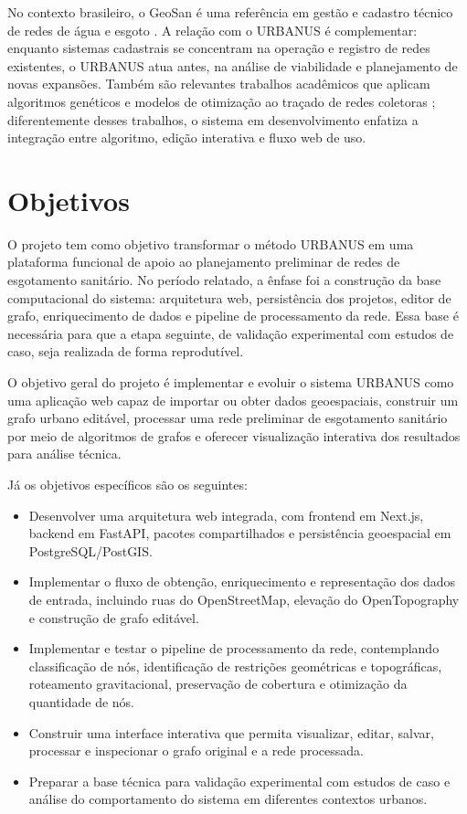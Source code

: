 \documentclass[12pt,a4paper]{article}
\begin{document}
No contexto brasileiro, o GeoSan é uma referência em gestão e cadastro técnico de redes de água e esgoto \cite{nexusgeosan}. A relação com o URBANUS é complementar: enquanto sistemas cadastrais se concentram na operação e registro de redes existentes, o URBANUS atua antes, na análise de viabilidade e planejamento de novas expansões. Também são relevantes trabalhos acadêmicos que aplicam algoritmos genéticos e modelos de otimização ao traçado de redes coletoras \cite{haghighi2012, rodrigues2020}; diferentemente desses trabalhos, o sistema em desenvolvimento enfatiza a integração entre algoritmo, edição interativa e fluxo web de uso.


\section{Objetivos}

O projeto tem como objetivo transformar o método URBANUS em uma plataforma funcional de apoio ao planejamento preliminar de redes de esgotamento sanitário. No período relatado, a ênfase foi a construção da base computacional do sistema: arquitetura web, persistência dos projetos, editor de grafo, enriquecimento de dados e pipeline de processamento da rede. Essa base é necessária para que a etapa seguinte, de validação experimental com estudos de caso, seja realizada de forma reprodutível.

O objetivo geral do projeto é implementar e evoluir o sistema URBANUS como uma aplicação web capaz de importar ou obter dados geoespaciais, construir um grafo urbano editável, processar uma rede preliminar de esgotamento sanitário por meio de algoritmos de grafos e oferecer visualização interativa dos resultados para análise técnica.

Já os objetivos específicos são os seguintes:

\begin{itemize}[leftmargin=1.5cm]
    \item Desenvolver uma arquitetura web integrada, com frontend em Next.js, backend em FastAPI, pacotes compartilhados e persistência geoespacial em PostgreSQL/PostGIS.
    \item Implementar o fluxo de obtenção, enriquecimento e representação dos dados de entrada, incluindo ruas do OpenStreetMap, elevação do OpenTopography e construção de grafo editável.
    \item Implementar e testar o pipeline de processamento da rede, contemplando classificação de nós, identificação de restrições geométricas e topográficas, roteamento gravitacional, preservação de cobertura e otimização da quantidade de nós.
    \item Construir uma interface interativa que permita visualizar, editar, salvar, processar e inspecionar o grafo original e a rede processada.
    \item Preparar a base técnica para validação experimental com estudos de caso e análise do comportamento do sistema em diferentes contextos urbanos.
\end{itemize}
\end{document}
